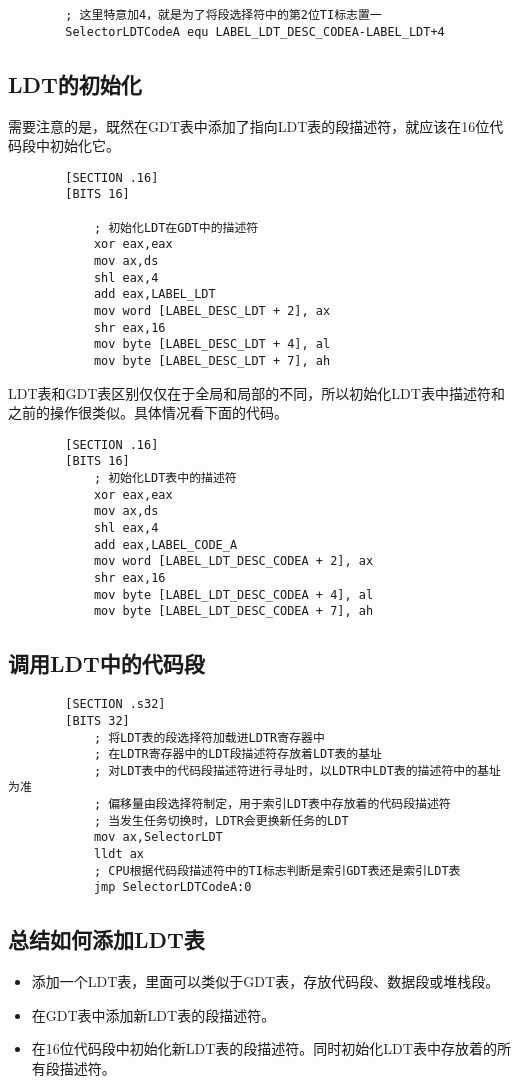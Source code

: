 \documentclass[a4paper,left=2.5cm,right=2.5cm,11pt]{article}
\begin{document}
	\begin{lstlisting}
		; 这里特意加4，就是为了将段选择符中的第2位TI标志置一
		SelectorLDTCodeA equ LABEL_LDT_DESC_CODEA-LABEL_LDT+4
	\end{lstlisting}
\subsection{LDT的初始化}
	需要注意的是，既然在GDT表中添加了指向LDT表的段描述符，就应该在16位代码段中初始化它。
	\begin{lstlisting}
		[SECTION .16]
		[BITS 16]
			
			; 初始化LDT在GDT中的描述符
			xor eax,eax
			mov ax,ds
			shl eax,4
			add eax,LABEL_LDT
			mov word [LABEL_DESC_LDT + 2], ax
			shr eax,16
			mov byte [LABEL_DESC_LDT + 4], al
			mov byte [LABEL_DESC_LDT + 7], ah
	\end{lstlisting}
	
	LDT表和GDT表区别仅仅在于全局和局部的不同，所以初始化LDT表中描述符和之前的操作很类似。具体情况看下面的代码。
	\begin{lstlisting}
		[SECTION .16]
		[BITS 16]
			; 初始化LDT表中的描述符
			xor eax,eax
			mov ax,ds
			shl eax,4
			add eax,LABEL_CODE_A
			mov word [LABEL_LDT_DESC_CODEA + 2], ax
			shr eax,16
			mov byte [LABEL_LDT_DESC_CODEA + 4], al
			mov byte [LABEL_LDT_DESC_CODEA + 7], ah
	\end{lstlisting}
\subsection{调用LDT中的代码段}
	\begin{lstlisting}
		[SECTION .s32]
		[BITS 32]
			; 将LDT表的段选择符加载进LDTR寄存器中
			; 在LDTR寄存器中的LDT段描述符存放着LDT表的基址
			; 对LDT表中的代码段描述符进行寻址时，以LDTR中LDT表的描述符中的基址为准
			; 偏移量由段选择符制定，用于索引LDT表中存放着的代码段描述符
			; 当发生任务切换时，LDTR会更换新任务的LDT
			mov ax,SelectorLDT
			lldt ax
			; CPU根据代码段描述符中的TI标志判断是索引GDT表还是索引LDT表
			jmp SelectorLDTCodeA:0
	\end{lstlisting}
\subsection{总结如何添加LDT表}
	\begin{itemize}
		\item 添加一个LDT表，里面可以类似于GDT表，存放代码段、数据段或堆栈段。
		\item 在GDT表中添加新LDT表的段描述符。
		\item 在16位代码段中初始化新LDT表的段描述符。同时初始化LDT表中存放着的所有段描述符。
	\end{itemize}
\end{document}

